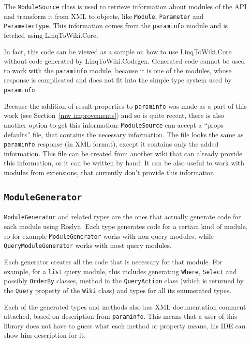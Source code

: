 The \lstinline{ModuleSource} class is used to retrieve information about modules of the API
and transform it from XML to objects, like \lstinline{Module}, \lstinline{Parameter} and \lstinline{Parameter}\lstBreak\lstinline{Type}.
This information comes from the \texttt{paraminfo} module and is fetched using LinqToWiki.Core.

In fact, this code can be viewed as a sample on how to use LinqToWiki.Core
without code generated by LinqToWiki.Codegen.
Generated code cannot be used to work with the \texttt{paraminfo} module,
because it is one of the modules, whose response is complicated
and does not fit into the simple type system used by \texttt{paraminfo}.

Because the addition of result properties to \texttt{paraminfo} was made as a part of this work
(see Section~\ref{mw improvements}) and so is quite recent, there is also another option to get this information:
\lstinline{ModuleSource} can accept a “props defaults” file, that contains the necessary information.
The file looks the same as \texttt{paraminfo} response (in XML format),
except it contains only the added information.
This file can be created from another wiki that can already provide this information,
or it can be written by hand.
It can be also useful to work with modules from extensions, that currently don't provide this information.

\subsection{\texorpdfstring{\lstinline{ModuleGenerator}}{ModuleGenerator}}

\lstinline{ModuleGenerator} and related types are the ones that actually generate code for each module using Roslyn.
Each type generates code for a certain kind of module,
so for example \lstinline{ModuleGenerator} works with non-query modules,
while \lstinline{QueryModuleGenerator} works with most query modules.

Each generator creates all the code that is necessary for that module.
For example, for a \texttt{list} query module,
this includes generating \lstinline{Where}, \lstinline{Select} and possibly \lstinline{OrderBy} classes,
method in the \lstinline{QueryAction} class
(which is returned by the \lstinline{Query} property of the \lstinline{Wiki} class)
and types for all its enumerated types.

Each of the generated types and methods also has XML documentation comment attached,
based on description from \texttt{paraminfo}.
This means that a user of this library does not have to guess what each method or property means,
his IDE can show him description for it.

